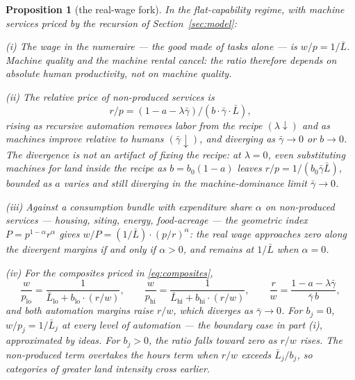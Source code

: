 \documentclass[12pt]{article}
\theoremstyle{plain}
\newtheorem{proposition}{Proposition}
\newcommand{\lo}{\mathrm{lo}}
\newcommand{\hi}{\mathrm{hi}}
\begin{document}
\begin{proposition}[the real-wage fork]\label{prop:fork}
In the flat-capability regime, with machine services priced by the recursion of Section~\ref{sec:model}:

(i) The wage in the numeraire --- the good made of tasks alone --- is $w/p = 1/\bar{L}$. Machine quality and the machine rental cancel: the ratio therefore depends on absolute human productivity, not on machine quality.

(ii) The relative price of non-produced services is
\begin{equation}\label{eq:fork-price}
r/p = (1 - a - \lambda \bar{\gamma}) / (b\cdot \bar{\gamma}\cdot \bar{L}),
\end{equation}
rising as recursive automation removes labor from the recipe $(\lambda\downarrow)$ and as machines improve relative to humans $(\bar{\gamma}\downarrow)$, and diverging as $\bar{\gamma}\to0$ or $b\to0$. The divergence is not an artifact of fixing the recipe: at $\lambda=0$, even substituting machines for land inside the recipe as $b=b_0(1-a)$ leaves $r/p=1/(b_0\bar{\gamma}\bar{L})$, bounded as $a$ varies and still diverging in the machine-dominance limit $\bar{\gamma}\to0$.

(iii) Against a consumption bundle with expenditure share $\alpha$ on non-produced services --- housing, siting, energy, food-acreage --- the geometric index $P = p^{1-\alpha}r^{\alpha}$ gives $w/P = (1/\bar{L})\cdot (p/r)^{\alpha}$: the real wage approaches zero along the divergent margins if and only if $\alpha > 0$, and remains at $1/\bar{L}$ when $\alpha = 0$.

(iv) For the composites priced in \eqref{eq:composites},
\begin{equation}\label{eq:fork-pair}
\frac{w}{p_{\lo}} = \frac{1}{\bar{L}_{\lo} + b_{\lo}\cdot (r/w)},
\qquad
\frac{w}{p_{\hi}} = \frac{1}{\bar{L}_{\hi} + b_{\hi}\cdot (r/w)},
\qquad
\frac{r}{w} = \frac{1-a-\lambda\bar{\gamma}}{\bar{\gamma}\, b},
\end{equation}
and both automation margins raise $r/w$, which diverges as $\bar{\gamma}\to0$. For $b_j=0$, $w/p_j=1/\bar{L}_j$ at every level of automation --- the boundary case in part (i), approximated by ideas. For $b_j>0$, the ratio falls toward zero as $r/w$ rises. The non-produced term overtakes the hours term when $r/w$ exceeds $\bar{L}_j/b_j$, so categories of greater land intensity cross earlier.
\end{proposition}
\end{document}
